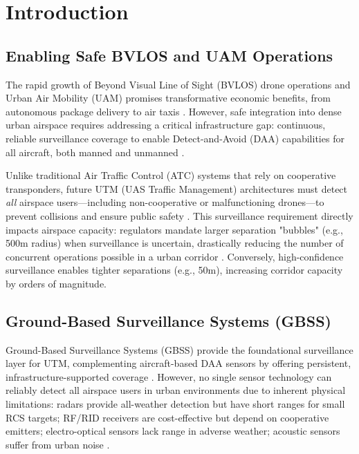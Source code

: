 
\section{Introduction}

\subsection{Enabling Safe BVLOS and UAM Operations}

The rapid growth of Beyond Visual Line of Sight (BVLOS) drone operations and Urban Air Mobility (UAM) promises transformative economic benefits, from autonomous package delivery to air taxis \cite{faa2023uam}. However, safe integration into dense urban airspace requires addressing a critical infrastructure gap: continuous, reliable surveillance coverage to enable Detect-and-Avoid (DAA) capabilities for all aircraft, both manned and unmanned \cite{mueller2017enabling}.

Unlike traditional Air Traffic Control (ATC) systems that rely on cooperative transponders, future UTM (UAS Traffic Management) architectures must detect \textit{all} airspace users—including non-cooperative or malfunctioning drones—to prevent collisions and ensure public safety \cite{faa2020utm}. This surveillance requirement directly impacts airspace capacity: regulators mandate larger separation "bubbles" (e.g., 500m radius) when surveillance is uncertain, drastically reducing the number of concurrent operations possible in a urban corridor \cite{nasa2021utm}. Conversely, high-confidence surveillance enables tighter separations (e.g., 50m), increasing corridor capacity by orders of magnitude.

\subsection{Ground-Based Surveillance Systems (GBSS)}

Ground-Based Surveillance Systems (GBSS) provide the foundational surveillance layer for UTM, complementing aircraft-based DAA sensors by offering persistent, infrastructure-supported coverage \cite{kopardekar2016unmanned}. However, no single sensor technology can reliably detect all airspace users in urban environments due to inherent physical limitations: radars provide all-weather detection but have short ranges for small RCS targets; RF/RID receivers are cost-effective but depend on cooperative emitters; electro-optical sensors lack range in adverse weather; acoustic sensors suffer from urban noise \cite{guvenc2018detection}.


